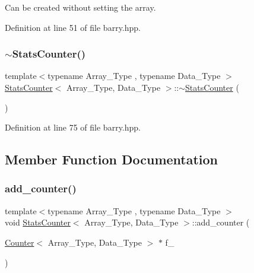 Can be created without setting the array. 



Definition at line 51 of file barry.\+hpp.

\mbox{\label{classbarry_1_1_stats_counter_a2824d86765d94e909e4b33396250b6c7}} 
\subsubsection{\texorpdfstring{$\sim$\+Stats\+Counter()}{~StatsCounter()}}
{\footnotesize\ttfamily template$<$typename Array\+\_\+\+Type , typename Data\+\_\+\+Type $>$ \\
\hyperlink{classbarry_1_1_stats_counter}{Stats\+Counter}$<$ Array\+\_\+\+Type, Data\+\_\+\+Type $>$\+::$\sim$\hyperlink{classbarry_1_1_stats_counter}{Stats\+Counter} (\begin{DoxyParamCaption}{ }\end{DoxyParamCaption})\hspace{0.3cm}{\ttfamily [inline]}}



Definition at line 75 of file barry.\+hpp.



\subsection{Member Function Documentation}
\mbox{\label{classbarry_1_1_stats_counter_a829e41243a7b18cf71337deeec9f7030}} 
\subsubsection{\texorpdfstring{add\+\_\+counter()}{add\_counter()}\hspace{0.1cm}{\footnotesize\ttfamily [1/2]}}
{\footnotesize\ttfamily template$<$typename Array\+\_\+\+Type , typename Data\+\_\+\+Type $>$ \\
void \hyperlink{classbarry_1_1_stats_counter}{Stats\+Counter}$<$ Array\+\_\+\+Type, Data\+\_\+\+Type $>$\+::add\+\_\+counter (\begin{DoxyParamCaption}\item[{\hyperlink{classbarry_1_1_counter}{Counter}$<$ Array\+\_\+\+Type, Data\+\_\+\+Type $>$ $\ast$}]{f\+\_\+ }\end{DoxyParamCaption})\hspace{0.3cm}{\ttfamily [inline]}}



